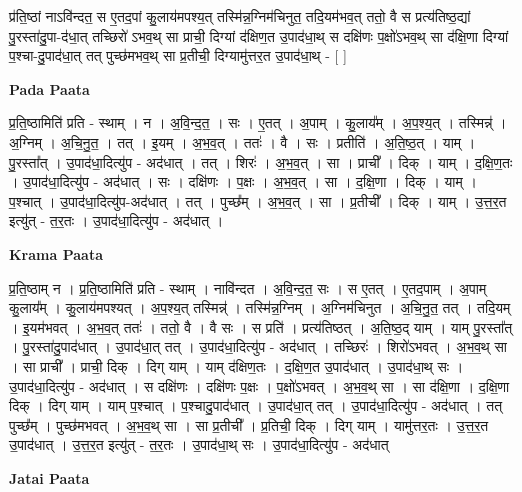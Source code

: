 \documentclass[17pt]{extarticle}
\begin{document}
प्र॑ति॒ष्ठां नाऽवि॑न्दत॒ स ए॒तद॒पां कु॒लाय॑मपश्य॒त् तस्मि॑न्न॒ग्निम॑चिनुत॒ तदि॒यम॑भव॒त् ततो॒ वै स प्रत्य॑तिष्ठ॒द्यां पु॒रस्ता॑दु॒पा-द॑धा॒त् तच्छिरो॑ ऽभव॒थ् सा प्राची॒ दिग्यां द॑क्षिण॒त उ॒पाद॑धा॒थ् स दक्षि॑णः प॒क्षो॑ऽभव॒थ् सा द॑क्षि॒णा दिग्यां प॒श्चा-दु॒पाद॑धा॒त् तत् पुच्छ॑मभव॒थ् सा प्र॒तीची॒ दिग्यामु॑त्तर॒त उ॒पाद॑धा॒थ् - [  ] \newline

\textbf{Pada Paata} \newline

प्र॒ति॒ष्ठामिति॑ प्रति - स्थाम् । न । अ॒वि॒न्द॒त॒ । सः । ए॒तत् । अ॒पाम् । कु॒लाय᳚म् । अ॒प॒श्य॒त् । तस्मिन्न्॑ । अ॒ग्निम् । अ॒चि॒नु॒त॒ । तत् । इ॒यम् । अ॒भ॒व॒त् । ततः॑ । वै । सः । प्रतीति॑ । अ॒ति॒ष्ठ॒त् । याम् । पु॒रस्ता᳚त् । उ॒पाद॑धा॒दित्यु॑प - अद॑धात् । तत् । शिरः॑ । अ॒भ॒व॒त् । सा । प्राची᳚ । दिक् । याम् । द॒क्षि॒ण॒तः । उ॒पाद॑धा॒दित्यु॑प - अद॑धात् । सः । दक्षि॑णः । प॒क्षः । अ॒भ॒व॒त् । सा । द॒क्षि॒णा । दिक् । याम् । प॒श्चात् । उ॒पाद॑धा॒दित्यु॑प-अद॑धात् । तत् । पुच्छ᳚म् । अ॒भ॒व॒त् । सा । प्र॒तीची᳚ । दिक् । याम् । उ॒त्त॒र॒त इत्यु॑त् - त॒र॒तः । उ॒पाद॑धा॒दित्यु॑प - अद॑धात् ।  \newline


\textbf{Krama Paata} \newline

प्र॒ति॒ष्ठाम् न । प्र॒ति॒ष्ठामिति॑ प्रति - स्थाम् । नावि॑न्दत । अ॒वि॒न्द॒त॒ सः । स ए॒तत् । ए॒तद॒पाम् । अ॒पाम् कु॒लाय᳚म् । कु॒लाय॑मपश्यत् । अ॒प॒श्य॒त् तस्मिन्न्॑ । तस्मि॑न्न॒ग्निम् । अ॒ग्निम॑चिनुत । अ॒चि॒नु॒त॒ तत् । तदि॒यम् । इ॒यम॑भवत् । अ॒भ॒व॒त् ततः॑ । ततो॒ वै । वै सः । स प्रति॑ । प्रत्य॑तिष्ठत् । अ॒ति॒ष्ठ॒द् याम् । याम् पु॒रस्ता᳚त् । पु॒रस्ता॑दु॒पाद॑धात् । उ॒पाद॑धा॒त् तत् । उ॒पाद॑धा॒दित्यु॑प - अद॑धात् । तच्छिरः॑ । शिरो॑ऽभवत् । अ॒भ॒व॒थ् सा । सा प्राची᳚ । प्राची॒ दिक् । दिग् याम् । याम् द॑क्षिण॒तः । द॒क्षि॒ण॒त उ॒पाद॑धात् । उ॒पाद॑धा॒थ् सः । उ॒पाद॑धा॒दित्यु॑प - अद॑धात् । स दक्षि॑णः । दक्षि॑णः प॒क्षः । प॒क्षो॑ऽभवत् । अ॒भ॒व॒थ् सा । सा द॑क्षि॒णा । द॒क्षि॒णा दिक् । दिग् याम् । याम् प॒श्चात् । प॒श्चादु॒पाद॑धात् । उ॒पाद॑धा॒त् तत् । उ॒पाद॑धा॒दित्यु॑प - अद॑धात् । तत् पुच्छ᳚म् । पुच्छ॑मभवत् । अ॒भ॒व॒थ् सा । सा प्र॒तीची᳚ । प्र॒तिची॒ दिक् । दिग् याम् । यामु॑त्तर॒तः । उ॒त्त॒र॒त उ॒पाद॑धात् । उ॒त्त॒र॒त इत्यु॑त् - त॒र॒तः । उ॒पाद॑धा॒थ् सः । उ॒पाद॑धा॒दित्यु॑प - अद॑धात् \newline

\textbf{Jatai Paata} \newline
\end{document}
